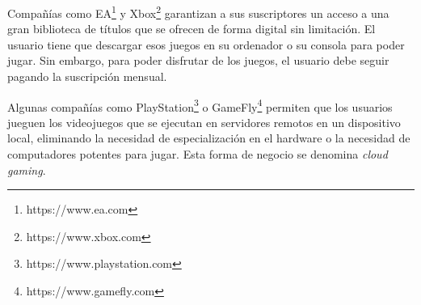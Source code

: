 Compañías como EA\footnote{https://www.ea.com} y Xbox\footnote{https://www.xbox.com} garantizan a sus suscriptores un acceso a una gran biblioteca de títulos que se ofrecen de forma digital sin limitación. El usuario tiene que descargar esos juegos en su ordenador o su consola para poder jugar. Sin embargo, para poder disfrutar de los juegos, el usuario debe seguir pagando la suscripción mensual.

Algunas compañías como PlayStation\footnote{https://www.playstation.com} o GameFly\footnote{https://www.gamefly.com} permiten que los usuarios jueguen los videojuegos que se ejecutan en servidores remotos en un dispositivo local, eliminando la necesidad de especialización en el hardware o la necesidad de computadores potentes para jugar. Esta forma de negocio se denomina \textit{cloud gaming}.












